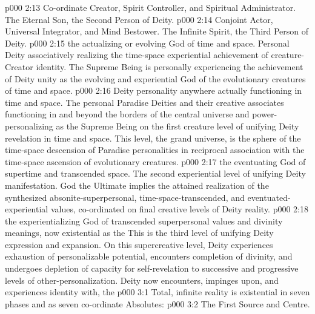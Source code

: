 \vs p000 2:13 \bibnobreakspace {} Co\hyp{}ordinate Creator, Spirit Controller, and Spiritual Administrator. The Eternal Son, the Second Person of Deity.
\vs p000 2:14 \bibnobreakspace {} Conjoint Actor, Universal Integrator, and Mind Bestower. The Infinite Spirit, the Third Person of Deity.
\vs p000 2:15 \bibnobreakspace {} the actualizing or evolving God of time and space. Personal Deity associatively realizing the time\hyp{}space experiential achievement of creature\hyp{}Creator identity. The Supreme Being is personally experiencing the achievement of Deity unity as the evolving and experiential God of the evolutionary creatures of time and space.
\vs p000 2:16 \bibnobreakspace {} Deity personality anywhere actually functioning in time and space. The personal Paradise Deities and their creative associates functioning in and beyond the borders of the central universe and power\hyp{}personalizing as the Supreme Being on the first creature level of unifying Deity revelation in time and space. This level, the grand universe, is the sphere of the time\hyp{}space descension of Paradise personalities in reciprocal association with the time\hyp{}space ascension of evolutionary creatures.
\vs p000 2:17 \bibnobreakspace {} the eventuating God of supertime and transcended space. The second experiential level of unifying Deity manifestation. God the Ultimate implies the attained realization of the synthesized absonite\hyp{}superpersonal, time\hyp{}space\hyp{}transcended, and eventuated\hyp{}experiential values, co\hyp{}ordinated on final creative levels of Deity reality.
\vs p000 2:18 \bibnobreakspace {} the experientializing God of transcended superpersonal values and divinity meanings, now existential as the  This is the third level of unifying Deity expression and expansion. On this supercreative level, Deity experiences exhaustion of personalizable potential, encounters completion of divinity, and undergoes depletion of capacity for self\hyp{}revelation to successive and progressive levels of other\hyp{}personalization. Deity now encounters, impinges upon, and experiences identity with, the 
\vs p000 3:1 Total, infinite reality is existential in seven phases and as seven co\hyp{}ordinate Absolutes:
\vs p000 3:2 \bibnobreakspace The First Source and Centre.
